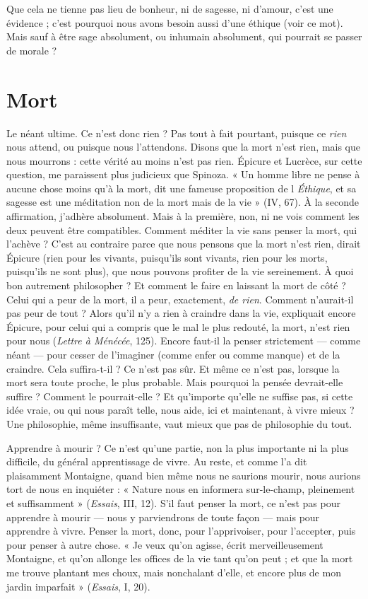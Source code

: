 Que cela ne tienne pas lieu de bonheur, ni de sagesse, ni d’amour, c’est une
évidence ; c’est pourquoi nous avons besoin aussi d’une éthique (voir ce mot).
Mais sauf à être sage absolument, ou inhumain absolument, qui pourrait se
passer de morale ?

\section{Mort}
Le néant ultime. Ce n’est donc rien ? Pas tout à fait pourtant, puisque
ce {\it rien} nous attend, ou puisque nous l’attendons. Disons que la
mort n’est rien, mais que nous mourrons : cette vérité au moins n’est pas rien.
Épicure et Lucrèce, sur cette question, me paraissent plus judicieux que Spinoza.
« Un homme libre ne pense à aucune chose moins qu’à la mort, dit une
fameuse proposition de l {\it Éthique}, et sa sagesse est une méditation non de la mort
mais de la vie » (IV, 67). À la seconde affirmation, j’adhère absolument. Mais à
la première, non, ni ne vois comment les deux peuvent être compatibles. Comment
méditer la vie sans penser la mort, qui l’achève ? C’est au contraire parce
que nous pensons que la mort n’est rien, dirait Épicure (rien pour les vivants,
puisqu'ils sont vivants, rien pour les morts, puisqu'ils ne sont plus), que nous
pouvons profiter de la vie sereinement. À quoi bon autrement philosopher ? Et
comment le faire en laissant la mort de côté ? Celui qui a peur de la mort, il a
peur, exactement, {\it de rien}. Comment n’aurait-il pas peur de tout ? Alors qu’il n’y
a rien à craindre dans la vie, expliquait encore Épicure, pour celui qui a compris
que le mal le plus redouté, la mort, n’est rien pour nous ({\it Lettre à Ménécée}, 125).
Encore faut-il la penser strictement — comme néant — pour cesser de l’imaginer
(comme enfer ou comme manque) et de la craindre. Cela suffira-t-il ? Ce n’est
pas sûr. Et même ce n’est pas, lorsque la mort sera toute proche, le plus probable.
Mais pourquoi la pensée devrait-elle suffire ? Comment le pourrait-elle ? Et
qu'importe qu’elle ne suffise pas, si cette idée vraie, ou qui nous paraît telle, nous
aide, ici et maintenant, à vivre mieux ? Une philosophie, même insuffisante, vaut
mieux que pas de philosophie du tout.

Apprendre à mourir ? Ce n’est qu’une partie, non la plus importante ni la
plus difficile, du général apprentissage de vivre. Au reste, et comme l’a dit plaisamment
Montaigne, quand bien même nous ne saurions mourir, nous aurions
tort de nous en inquiéter : « Nature nous en informera sur-le-champ, pleinement
et suffisamment » ({\it Essais}, III, 12). S’il faut penser la mort, ce n’est pas
pour apprendre à mourir — nous y parviendrons de toute façon — mais pour
apprendre à vivre. Penser la mort, donc, pour l’apprivoiser, pour l’accepter,
puis pour penser à autre chose. « Je veux qu’on agisse, écrit merveilleusement
Montaigne, et qu’on allonge les offices de la vie tant qu’on peut ; et que la mort
me trouve plantant mes choux, mais nonchalant d’elle, et encore plus de mon
jardin imparfait » ({\it Essais}, I, 20).

